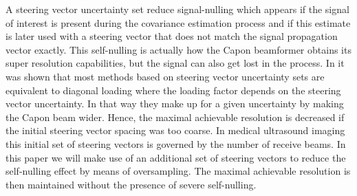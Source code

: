 \documentclass[journal]{IEEEtran}
\begin{document}

%

A steering vector uncertainty set reduce signal-nulling which appears if the signal of interest is present during the covariance estimation process and if this estimate is later used with a steering vector that does not match the signal propagation vector exactly. This self-nulling is actually how the Capon beamformer obtains its super resolution capabilities, but the signal can also get lost in the process. In \cite{JianLi2003} it was shown that most methods based on steering vector uncertainty sets are equivalent to diagonal loading where the loading factor depends on the steering vector uncertainty. In that way they make up for a given uncertainty by making the Capon beam wider. Hence, the maximal achievable resolution is decreased if the initial steering vector spacing was too coarse. In medical ultrasound imaging this initial set of steering vectors is governed by the number of receive beams. In this paper we will make use of an additional set of steering vectors to reduce the self-nulling effect by means of oversampling. The maximal achievable resolution is then maintained without the presence of severe self-nulling.
\end{document}
